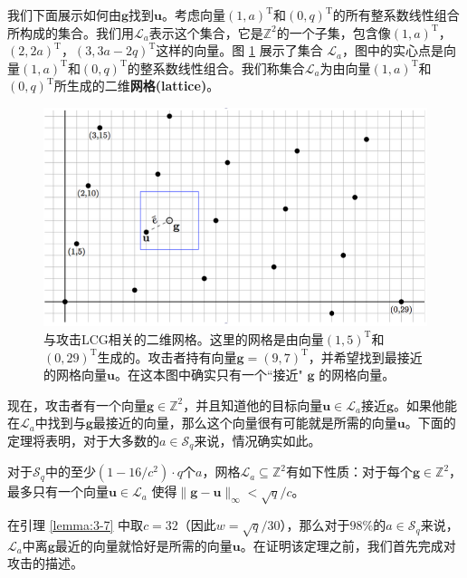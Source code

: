 \begin{snote}[密码分析。]
我们下面展示如何由$\boldsymbol{g}$找到$\boldsymbol{u}$。考虑向量$(1,a)^\mathrm{T}$和$(0,q)^\mathrm{T}$的所有整系数线性组合所构成的集合。我们用$\mathcal{L}_a$表示这个集合，它是$\mathbb{Z}^2$的一个子集，包含像$(1,a)^\mathrm{T}$，$(2,2a)^\mathrm{T}$，$(3,3a-2q)^\mathrm{T}$这样的向量。图 \ref{fig:3-9} 展示了集合 $\mathcal{L}_a$，图中的实心点是向量$(1,a)^\mathrm{T}$和$(0,q)^\mathrm{T}$的整系数线性组合。我们称集合$\mathcal{L}_a$为由向量$(1,a)^\mathrm{T}$和$(0,q)^\mathrm{T}$所生成的二维\textbf{网格(lattice)}。

\begin{figure}
  \centering
  \includegraphics[width=0.6\linewidth]{figures/chapter3/fig9.png}
  \caption{与攻击LCG相关的二维网格。这里的网格是由向量$(1,5)^\mathrm{T}$和$(0,29)^\mathrm{T}$生成的。攻击者持有向量$\boldsymbol{g}=(9,7)^\mathrm{T}$，并希望找到最接近的网格向量$\boldsymbol{u}$。在这本图中确实只有一个``接近" $\boldsymbol{g}$ 的网格向量。}
  \label{fig:3-9}
\end{figure}

现在，攻击者有一个向量$\boldsymbol{g}\in\mathbb{Z}^2$，并且知道他的目标向量$\boldsymbol{u}\in\mathcal{L}_a$接近$\boldsymbol{g}$。如果他能在$\mathcal{L}_a$中找到与$\boldsymbol{g}$最接近的向量，那么这个向量很有可能就是所需的向量$\boldsymbol{u}$。下面的定理将表明，对于大多数的$a\in\mathcal{S}_q$来说，情况确实如此。
\end{snote}

\begin{lemma}\label{lemma:3-7}
对于$\mathcal{S}_q$中的至少$(1-16/c^2)\cdot q$个$a$，网格$\mathcal{L}_a\subseteq\mathbb{Z}^2$有如下性质：对于每个$\boldsymbol{g}\in\mathbb{Z}^2$，最多只有一个向量$\boldsymbol{u}\in\mathcal{L}_a$ 使得$\lVert\boldsymbol{g}-\boldsymbol{u}\rVert_\infty < \sqrt{q}/c$。
\end{lemma}

在引理 \ref{lemma:3-7} 中取$c=32$（因此$w=\sqrt{q}/30$），那么对于$98\%$的$a\in\mathcal{S}_q$来说，$\mathcal{L}_a$中离$\boldsymbol{g}$最近的向量就恰好是所需的向量$\boldsymbol{u}$。在证明该定理之前，我们首先完成对攻击的描述。

